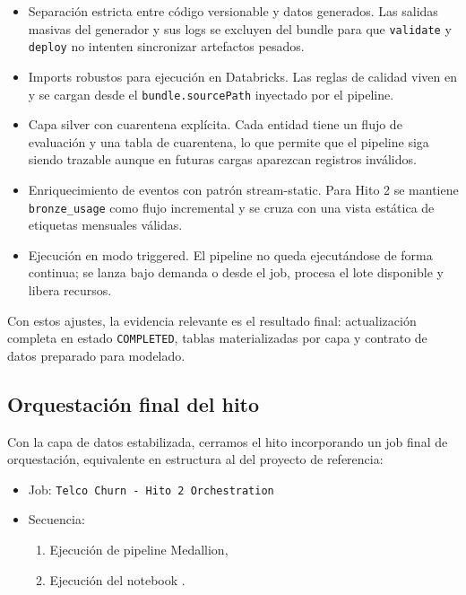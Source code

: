 \documentclass[12pt,a4paper]{article}
\begin{document}
\begin{itemize}
    \item Separación estricta entre código versionable y datos generados. Las salidas masivas del generador y sus logs se excluyen del bundle para que \texttt{validate} y \texttt{deploy} no intenten sincronizar artefactos pesados.
    \item Imports robustos para ejecución en Databricks. Las reglas de calidad viven en  y se cargan desde el \texttt{bundle.sourcePath} inyectado por el pipeline.
    \item Capa silver con cuarentena explícita. Cada entidad tiene un flujo de evaluación y una tabla de cuarentena, lo que permite que el pipeline siga siendo trazable aunque en futuras cargas aparezcan registros inválidos.
    \item Enriquecimiento de eventos con patrón stream-static. Para Hito 2 se mantiene \texttt{bronze\_usage} como flujo incremental y se cruza con una vista estática de etiquetas mensuales válidas.
    \item Ejecución en modo triggered. El pipeline no queda ejecutándose de forma continua; se lanza bajo demanda o desde el job, procesa el lote disponible y libera recursos.
\end{itemize}

Con estos ajustes, la evidencia relevante es el resultado final: actualización completa en estado \texttt{COMPLETED}, tablas materializadas por capa y contrato de datos preparado para modelado.

\subsection{Orquestación final del hito}

Con la capa de datos estabilizada, cerramos el hito incorporando un job final de orquestación, equivalente en estructura al del proyecto de referencia:

\begin{itemize}
    \item Job: \texttt{Telco Churn - Hito 2 Orchestration}
    \item Secuencia:
    \begin{enumerate}
        \item Ejecución de pipeline Medallion,
        \item Ejecución del notebook .
    \end{enumerate}
\end{itemize}
\end{document}
